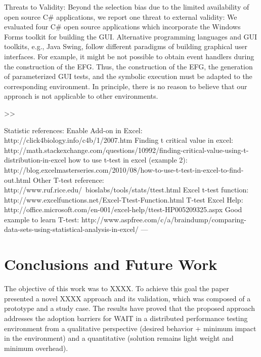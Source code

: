 \documentclass[runningheads,a4paper]{llncs}
\begin{document}
Threats to Validity: Beyond the selection bias due to the limited availability of open source 
C# applications, we report one threat to external validity: We evaluated four C# open
source applications which incorporate the Windows Forms toolkit for building
the GUI. Alternative programming languages and GUI toolkits, e.g., Java Swing,
follow different paradigms of building graphical user interfaces. For example, it
might be not possible to obtain event handlers during the construction of the
EFG. Thus, the construction of the EFG, the generation of parameterized GUI
tests, and the symbolic execution must be adapted to the corresponding environment.
In principle, there is no reason to believe that our approach is not
applicable to other environments.

>>

Statistic references:
Enable Add-on in Excel: http://click4biology.info/c4b/1/2007.htm
Finding t critical value in excel: http://math.stackexchange.com/questions/10992/finding-critical-value-using-t-distribution-in-excel
how to use t-test in excel (example 2): http://blog.excelmasterseries.com/2010/08/how-to-use-t-test-in-excel-to-find-out.html
Other T-test reference: http://www.ruf.rice.edu/~bioslabs/tools/stats/ttest.html
Excel t-test function: http://www.excelfunctions.net/Excel-Ttest-Function.html
T-test Excel Help: http://office.microsoft.com/en-001/excel-help/ttest-HP005209325.aspx
Good example to learn T-test: http://www.aspfree.com/c/a/braindump/comparing-data-sets-using-statistical-analysis-in-excel/
---



\section{Conclusions and Future Work}

The objective of this work was to XXXX. To achieve this goal the 
paper presented a novel XXXX approach and its validation, which was composed of
a prototype and a study case. The results have proved that the 
proposed approach addresses the adoption barriers for WAIT in a
distributed performance testing environment from a qualitative perspective 
(desired behavior + minimum impact in the environment) and a quantitative 
(solution remains light weight and minimum overhead).
\end{document}
